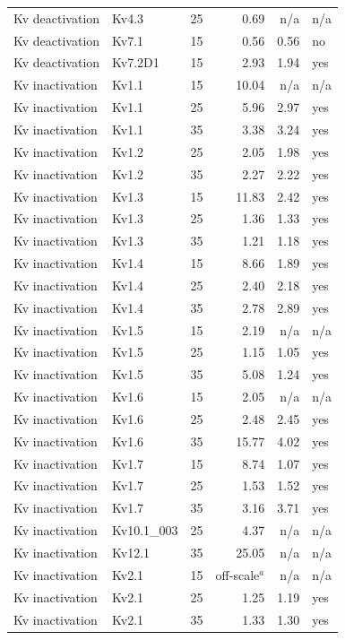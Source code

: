 \begin{longtable}{lllrrl}
Kv deactivation & Kv4.3 & 25 & 0.69 & n/a & n/a \\
Kv deactivation & Kv7.1 & 15 & 0.56 & 0.56 & no \\
Kv deactivation & Kv7.2D1 & 15 & 2.93 & 1.94 & yes \\
\midrule
Kv inactivation & Kv1.1 & 15 & 10.04 & n/a & n/a \\
Kv inactivation & Kv1.1 & 25 & 5.96 & 2.97 & yes \\
Kv inactivation & Kv1.1 & 35 & 3.38 & 3.24 & yes \\
Kv inactivation & Kv1.2 & 25 & 2.05 & 1.98 & yes \\
Kv inactivation & Kv1.2 & 35 & 2.27 & 2.22 & yes \\
Kv inactivation & Kv1.3 & 15 & 11.83 & 2.42 & yes \\
Kv inactivation & Kv1.3 & 25 & 1.36 & 1.33 & yes \\
Kv inactivation & Kv1.3 & 35 & 1.21 & 1.18 & yes \\
Kv inactivation & Kv1.4 & 15 & 8.66 & 1.89 & yes \\
Kv inactivation & Kv1.4 & 25 & 2.40 & 2.18 & yes \\
Kv inactivation & Kv1.4 & 35 & 2.78 & 2.89 & yes \\
Kv inactivation & Kv1.5 & 15 & 2.19 & n/a & n/a \\
Kv inactivation & Kv1.5 & 25 & 1.15 & 1.05 & yes \\
Kv inactivation & Kv1.5 & 35 & 5.08 & 1.24 & yes \\
Kv inactivation & Kv1.6 & 15 & 2.05 & n/a & n/a \\
Kv inactivation & Kv1.6 & 25 & 2.48 & 2.45 & yes \\
Kv inactivation & Kv1.6 & 35 & 15.77 & 4.02 & yes \\
Kv inactivation & Kv1.7 & 15 & 8.74 & 1.07 & yes \\
Kv inactivation & Kv1.7 & 25 & 1.53 & 1.52 & yes \\
Kv inactivation & Kv1.7 & 35 & 3.16 & 3.71 & yes \\
Kv inactivation & Kv10.1\_003 & 25 & 4.37 & n/a & n/a \\
Kv inactivation & Kv12.1 & 35 & 25.05 & n/a & n/a \\
Kv inactivation & Kv2.1 & 15 & off-scale$^{a}$ & n/a & n/a \\
Kv inactivation & Kv2.1 & 25 & 1.25 & 1.19 & yes \\
Kv inactivation & Kv2.1 & 35 & 1.33 & 1.30 & yes \\

\end{longtable}
